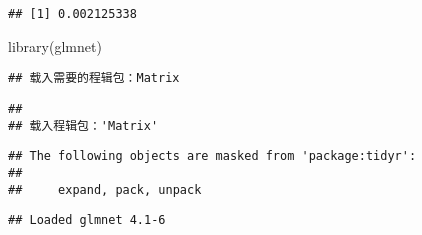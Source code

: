 \documentclass[
]{article}
\newenvironment{Shaded}{\begin{snugshade}}{\end{snugshade}}
\newcommand{\AttributeTok}[1]{\textcolor[rgb]{0.77,0.63,0.00}{#1}}
\newcommand{\DecValTok}[1]{\textcolor[rgb]{0.00,0.00,0.81}{#1}}
\newcommand{\FunctionTok}[1]{\textcolor[rgb]{0.00,0.00,0.00}{#1}}
\newcommand{\NormalTok}[1]{#1}
\newcommand{\OtherTok}[1]{\textcolor[rgb]{0.56,0.35,0.01}{#1}}
\newcommand{\SpecialCharTok}[1]{\textcolor[rgb]{0.00,0.00,0.00}{#1}}
\newcommand{\StringTok}[1]{\textcolor[rgb]{0.31,0.60,0.02}{#1}}
\begin{document}
\begin{Shaded}
\end{Shaded}

\begin{verbatim}
## [1] 0.002125338
\end{verbatim}

\begin{Shaded}
\begin{Highlighting}[]
\FunctionTok{library}\NormalTok{(glmnet)}
\end{Highlighting}
\end{Shaded}

\begin{verbatim}
## 载入需要的程辑包：Matrix
\end{verbatim}

\begin{verbatim}
## 
## 载入程辑包：'Matrix'
\end{verbatim}

\begin{verbatim}
## The following objects are masked from 'package:tidyr':
## 
##     expand, pack, unpack
\end{verbatim}

\begin{verbatim}
## Loaded glmnet 4.1-6
\end{verbatim}

\begin{Shaded}
\end{Shaded}
\end{document}
